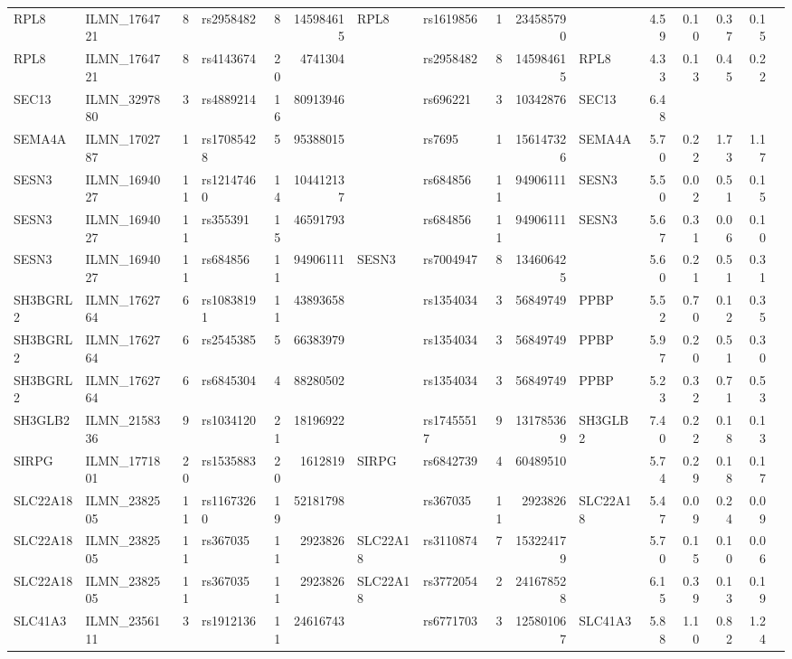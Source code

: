 \documentclass{article}
\begin{document}
\begin{landscape}
{\begin{ThreePartTable}
\begin{longtable}{|llr|lrrl|lrrl|rrrr|r|}
RPL8 & ILMN\_1764721 & 8 & rs2958482 & 8 & 145984615 & RPL8 & rs1619856 & 1 & 234585790 &  & 4.59 & 0.10 & 0.37 & 0.15 &  \\
RPL8 & ILMN\_1764721 & 8 & rs4143674 & 20 & 4741304 &  & rs2958482 & 8 & 145984615 & RPL8 & 4.33 & 0.13 & 0.45 & 0.22 &  \\
SEC13 & ILMN\_3297880 & 3 & rs4889214 & 16 & 80913946 &  & rs696221 & 3 & 10342876 & SEC13 & 6.48 &  &  &  &  \\
SEMA4A & ILMN\_1702787 & 1 & rs17085428 & 5 & 95388015 &  & rs7695 & 1 & 156147326 & SEMA4A & 5.70 & 0.22 & 1.73 & 1.17 &  \\
SESN3 & ILMN\_1694027 & 11 & rs12147460 & 14 & 104412137 &  & rs684856 & 11 & 94906111 & SESN3 & 5.50 & 0.02 & 0.51 & 0.15 &  \\
SESN3 & ILMN\_1694027 & 11 & rs355391 & 15 & 46591793 &  & rs684856 & 11 & 94906111 & SESN3 & 5.67 & 0.31 & 0.06 & 0.10 &  \\
SESN3 & ILMN\_1694027 & 11 & rs684856 & 11 & 94906111 & SESN3 & rs7004947 & 8 & 134606425 &  & 5.60 & 0.21 & 0.51 & 0.31 &  \\
SH3BGRL2 & ILMN\_1762764 & 6 & rs10838191 & 11 & 43893658 &  & rs1354034 & 3 & 56849749 & PPBP & 5.52 & 0.70 & 0.12 & 0.35 &  \\
SH3BGRL2 & ILMN\_1762764 & 6 & rs2545385 & 5 & 66383979 &  & rs1354034 & 3 & 56849749 & PPBP & 5.97 & 0.20 & 0.51 & 0.30 &  \\
SH3BGRL2 & ILMN\_1762764 & 6 & rs6845304 & 4 & 88280502 &  & rs1354034 & 3 & 56849749 & PPBP & 5.23 & 0.32 & 0.71 & 0.53 &  \\
SH3GLB2 & ILMN\_2158336 & 9 & rs1034120 & 21 & 18196922 &  & rs17455517 & 9 & 131785369 & SH3GLB2 & 7.40 & 0.22 & 0.18 & 0.13 &  \\
SIRPG & ILMN\_1771801 & 20 & rs1535883 & 20 & 1612819 & SIRPG & rs6842739 & 4 & 60489510 &  & 5.74 & 0.29 & 0.18 & 0.17 &  \\
SLC22A18 & ILMN\_2382505 & 11 & rs11673260 & 19 & 52181798 &  & rs367035 & 11 & 2923826 & SLC22A18 & 5.47 & 0.09 & 0.24 & 0.09 &  \\
SLC22A18 & ILMN\_2382505 & 11 & rs367035 & 11 & 2923826 & SLC22A18 & rs3110874 & 7 & 153224179 &  & 5.70 & 0.15 & 0.10 & 0.06 &  \\
SLC22A18 & ILMN\_2382505 & 11 & rs367035 & 11 & 2923826 & SLC22A18 & rs3772054 & 2 & 241678528 &  & 6.15 & 0.39 & 0.13 & 0.19 &  \\
SLC41A3 & ILMN\_2356111 & 3 & rs1912136 & 11 & 24616743 &  & rs6771703 & 3 & 125801067 & SLC41A3 & 5.88 & 1.10 & 0.82 & 1.24 &  \\

\end{longtable}
\end{ThreePartTable}}
\end{landscape}
\end{document}

